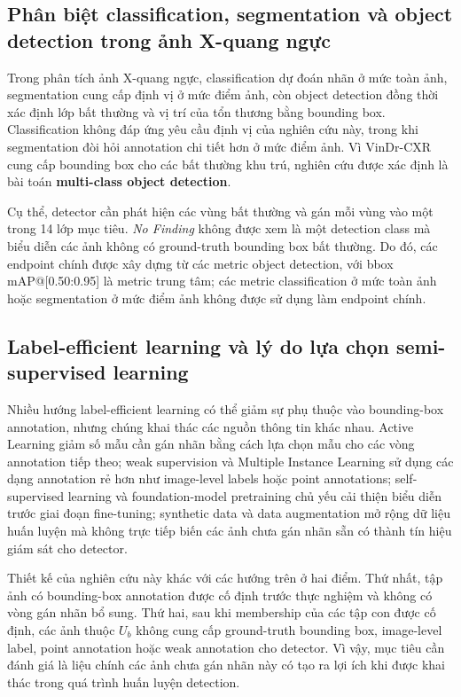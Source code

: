\documentclass[pdflatex,sn-mathphys-num]{sn-jnl}%
\theoremstyle{thmstyleone}%
\theoremstyle{thmstyletwo}%
\theoremstyle{thmstylethree}%
\begin{document}
\subsection{Phân biệt classification, segmentation và object detection trong ảnh X-quang ngực}

Trong phân tích ảnh X-quang ngực, classification dự đoán nhãn ở mức toàn ảnh,
segmentation cung cấp định vị ở mức điểm ảnh, còn object detection đồng thời
xác định lớp bất thường và vị trí của tổn thương bằng bounding box.
Classification không đáp ứng yêu cầu định vị của nghiên cứu này, trong khi
segmentation đòi hỏi annotation chi tiết hơn ở mức điểm ảnh. Vì VinDr-CXR cung
cấp bounding box cho các bất thường khu trú, nghiên cứu được xác định là bài toán
\textbf{multi-class object detection}.

Cụ thể, detector cần phát hiện các vùng bất thường và gán mỗi vùng vào một trong
14 lớp mục tiêu. \textit{No Finding} không được xem là một detection class mà
biểu diễn các ảnh không có ground-truth bounding box bất thường. Do đó, các
endpoint chính được xây dựng từ các metric object detection, với bbox
mAP@[0.50:0.95] là metric trung tâm; các metric classification ở mức toàn ảnh
hoặc segmentation ở mức điểm ảnh không được sử dụng làm endpoint chính.

\subsection{Label-efficient learning và lý do lựa chọn semi-supervised learning}

Nhiều hướng label-efficient learning có thể giảm sự phụ thuộc vào bounding-box
annotation, nhưng chúng khai thác các nguồn thông tin khác nhau. Active Learning
giảm số mẫu cần gán nhãn bằng cách lựa chọn mẫu cho các vòng annotation tiếp
theo; weak supervision và Multiple Instance Learning sử dụng các dạng annotation
rẻ hơn như image-level labels hoặc point annotations; self-supervised learning
và foundation-model pretraining chủ yếu cải thiện biểu diễn trước giai đoạn
fine-tuning; synthetic data và data augmentation mở rộng dữ liệu huấn luyện mà
không trực tiếp biến các ảnh chưa gán nhãn sẵn có thành tín hiệu giám sát cho
detector.

Thiết kế của nghiên cứu này khác với các hướng trên ở hai điểm. Thứ nhất, tập
ảnh có bounding-box annotation được cố định trước thực nghiệm và không có vòng
gán nhãn bổ sung. Thứ hai, sau khi membership của các tập con được cố định, các
ảnh thuộc \(U_b\) không cung cấp ground-truth bounding box, image-level label,
point annotation hoặc weak annotation cho detector. Vì vậy, mục tiêu cần đánh
giá là liệu chính các ảnh chưa gán nhãn này có tạo ra lợi ích khi được khai thác
trong quá trình huấn luyện detection.
\end{document}
